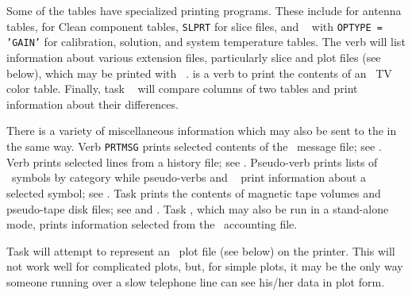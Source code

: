      Some of the tables have specialized printing programs.  These
include {\tt {}} for antenna tables, {\tt {}} for
Clean component tables, {\tt SLPRT} for slice files, and {\tt
{}} with {\tt OPTYPE = 'GAIN'} for calibration, solution,
and system temperature tables.  The verb {\tt {}} will
list information about various extension files, particularly slice and
plot files (see below), which may be printed with {\tt
{}}\@.  {\tt {}} is a verb to print the
contents of an \AIPS\ TV color table.  Finally, task {\tt
{}} will compare columns of two tables and print information
about their differences.


     There is a variety of miscellaneous information which may also be
sent to the  in the same way.  Verb {\tt PRTMSG} prints
selected contents of the \AIPS\ message file; see .  Verb
{\tt {}} prints selected lines from a history file; see
.  Pseudo-verb {\tt {}} prints lists of \AIPS\
symbols by category while pseudo-verbs {\tt {}} and {\tt
\tndx{EXPLAIN}} print information about a selected symbol; see
.  Task {\tt {}} prints the contents of magnetic
tape volumes and pseudo-tape disk files; see \Sec{prttp} and
.  Task {\tt {}}, which may also be run in a
stand-alone mode, prints information selected from the \AIPS\
accounting file.

     Task {\tt {}} will attempt to represent an \AIPS\ plot
file (see below) on the printer.  This will not work well for
complicated plots, but, for simple plots, it may be the only way
someone running over a slow telephone line can see his/her data in
plot form.



